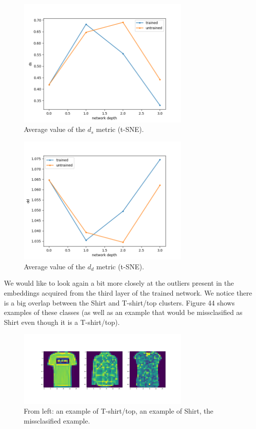 \documentclass{article}
\begin{document}
\begin{figure}
  \centering
    \includegraphics[width=0.75\textwidth]{../../out/activations_cnn/fmnist/t-sne/plot_metric_ds.png}
    \caption{Average value of the \(d_s\) metric (t-SNE).}
\end{figure}

\begin{figure}
  \centering
    \includegraphics[width=0.75\textwidth]{../../out/activations_cnn/fmnist/t-sne/plot_metric_dd.png}
    \caption{Average value of the \(d_d\) metric (t-SNE).}
\end{figure}

We would like to look again a bit more closely at the outliers present
in the embeddings acquired from the third layer of the trained network.
We notice there is a big overlap between the Shirt and T-shirt/top
clusters. Figure 44 shows examples of these classes (as well as an
example that would be missclasified as Shirt even though it is a
T-shirt/top).

\begin{figure}
  \centering
  \includegraphics[width=0.75\textwidth]{../../out/activations_cnn/fmnist/t-sne/outliers/correct0_predicted6.png}
    \caption{From left: an example of T-shirt/top, an example of Shirt, the missclasified example.}
\end{figure}
\end{document}
